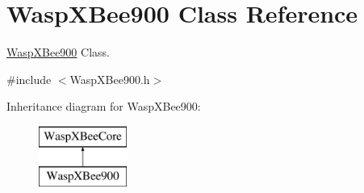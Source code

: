 \hypertarget{class_wasp_x_bee900}{}\section{Wasp\+X\+Bee900 Class Reference}
\label{class_wasp_x_bee900}


\hyperlink{class_wasp_x_bee900}{Wasp\+X\+Bee900} Class.  




{\ttfamily \#include $<$Wasp\+X\+Bee900.\+h$>$}

Inheritance diagram for Wasp\+X\+Bee900\+:\begin{figure}[H]
\begin{center}
\leavevmode
\includegraphics[height=2.000000cm]{class_wasp_x_bee900}
\end{center}
\end{figure}
